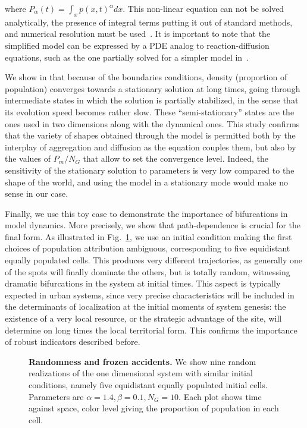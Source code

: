 \documentclass[10pt,letterpaper]{article}
\begin{document}
where $P_{\alpha}(t) = \int_x p(x,t)^{\alpha} dx$. This non-linear equation can not be solved analytically, the presence of integral terms putting it out of standard methods, and numerical resolution must be used~\cite{tadmor2012review}. It is important to note that the simplified model can be expressed by a PDE analog to reaction-diffusion equations, such as the one partially solved for a simpler model in~\cite{bosch1990velocity}.

We show in  that because of the boundaries conditions, density (proportion of population) converges towards a stationary solution at long times, going through intermediate states in which the solution is partially stabilized, in the sense that its evolution speed becomes rather slow. These ``semi-stationary'' states are the ones used in two dimensions along with the dynamical ones. This study confirms that the variety of shapes obtained through the model is permitted both by the interplay of aggregation and diffusion as the equation couples them, but also by the values of $P_m / N_G$ that allow to set the convergence level. Indeed, the sensitivity of the stationary solution to parameters is very low compared to the shape of the world, and using the model in a stationary mode would make no sense in our case.

Finally, we use this toy case to demonstrate the importance of bifurcations in model dynamics. More precisely, we show that path-dependence is crucial for the final form. As illustrated in Fig.~\ref{fig:fig5}, we use an initial condition making the first choices of population attribution ambiguous, corresponding to five equidistant equally populated cells. This produces very different trajectories, as generally one of the spots will finally dominate the others, but is totally random, witnessing dramatic bifurcations in the system at initial times. This aspect is typically expected in urban systems, since very precise characteristics will be included in the determinants of localization at the initial moments of system genesis: the existence of a very local resource, or the strategic advantage of the site, will determine on long times the local territorial form. This confirms the importance of robust indicators described before.


\begin{figure}[!h]
\caption{\textbf{Randomness and frozen accidents.} We show nine random realizations of the one dimensional system with similar initial conditions, namely five equidistant equally populated initial cells. Parameters are $\alpha = 1.4,\beta =0.1,N_G=10$. Each plot shows time against space, color level giving the proportion of population in each cell.}
\label{fig:fig5}
\end{figure}
\end{document}
